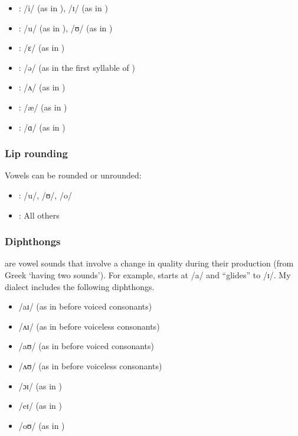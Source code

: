 \begin{itemize}[noitemsep]
    \item {}: /i/ (as in ), /ɪ/ (as in )
    \item {}: /u/ (as in ), /ʊ/ (as in )
    \item {}: /ɛ/ (as in )
    \item {}: /ə/ (as in the first syllable of )
    \item {}: /ʌ/ (as in )
    \item {}: /æ/ (as in )
    \item {}: /ɑ/ (as in )
\end{itemize}

\subsubsection{Lip rounding}

Vowels can be rounded or unrounded:

\begin{itemize}[noitemsep]
    \item {}: /u/, /ʊ/, /o/
    \item {}: All others
\end{itemize}

\subsubsection{Diphthongs}

 are vowel sounds that involve a change in quality during their production (from Greek  `having two sounds'). For example,  starts at /a/ and ``glides'' to /ɪ/. My dialect includes the following diphthongs.

\begin{itemize}[noitemsep]
    \item /aɪ/ (as in  before voiced consonants)
    \item /ʌɪ/ (as in  before voiceless consonants)
    \item /aʊ/ (as in  before voiced consonants)
    \item /ʌʊ/ (as in  before voiceless consonants)
    \item /ɔɪ/ (as in )
    \item /eɪ/ (as in )
    \item /oʊ/ (as in )
\end{itemize}

